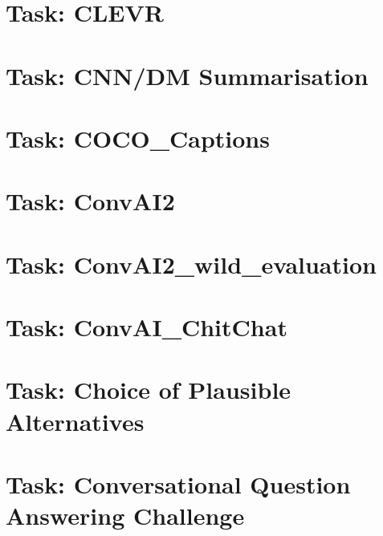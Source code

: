\documentclass[twoside]{book}
\newcommand{\+}{\discretionary{\mbox{\scriptsize$\hookleftarrow$}}{}{}}
\begin{document}
\chapter{Task\+: C\+L\+E\+VR}
\label{md_parlai_tasks_clevr_README}

\chapter{Task\+: C\+N\+N/\+DM Summarisation}
\label{md_parlai_tasks_cnn_dm_README}

\chapter{Task\+: C\+O\+C\+O\+\_\+\+Captions}
\label{md_parlai_tasks_coco_caption_README}

\chapter{Task\+: Conv\+A\+I2}
\label{md_parlai_tasks_convai2_README}

\chapter{Task\+: Conv\+A\+I2\+\_\+wild\+\_\+evaluation}
\label{md_parlai_tasks_convai2_wild_evaluation_README}

\chapter{Task\+: Conv\+A\+I\+\_\+\+Chit\+Chat}
\label{md_parlai_tasks_convai_chitchat_README}

\chapter{Task\+: Choice of Plausible Alternatives}
\label{md_parlai_tasks_copa_README}

\chapter{Task\+: Conversational Question Answering Challenge}
\label{md_parlai_tasks_coqa_README}

\end{document}

